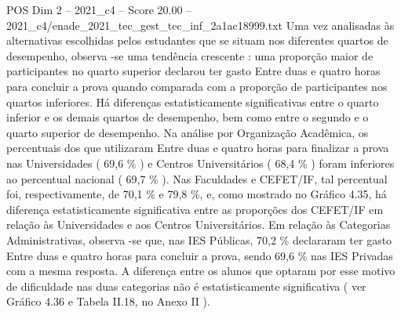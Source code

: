 \begin{textsample}{POS Dim 2 – 2021\_c4 – Score 20.00 – 2021\_c4/enade\_2021\_tec\_gest\_tec\_inf\_2a1ac18999.txt}
Uma vez analisadas às alternativas escolhidas pelos estudantes que se situam nos diferentes quartos de desempenho, observa -se uma tendência crescente : uma proporção maior de participantes no quarto superior declarou ter gasto Entre duas e quatro horas para concluir a prova quando comparada com a proporção de participantes nos quartos inferiores.
Há diferenças estatisticamente significativas entre o quarto inferior e os demais quartos de desempenho, bem como entre o segundo e o quarto superior de desempenho.
Na análise por Organização Acadêmica, os percentuais dos que utilizaram Entre duas e quatro horas para finalizar a prova nas Universidades ( 69,6 \% ) e Centros Universitários ( 68,4 \% ) foram inferiores ao percentual nacional ( 69,7 \% ).
Nas Faculdades e CEFET/IF, tal percentual foi, respectivamente, de 70,1 \% e 79,8 \%, e, como mostrado no Gráfico 4.35, há diferença estatisticamente significativa entre as proporções dos CEFET/IF em relação às Universidades e aos Centros Universitários.
Em relação às Categorias Administrativas, observa -se que, nas IES Públicas, 70,2 \% declararam ter gasto Entre duas e quatro horas para concluir a prova, sendo 69,6 \% nas IES Privadas com a mesma resposta.
A diferença entre os alunos que optaram por esse motivo de dificuldade nas duas categorias não é estatisticamente significativa ( ver Gráfico 4.36 e Tabela II.18, no Anexo II ).

\end{textsample}
